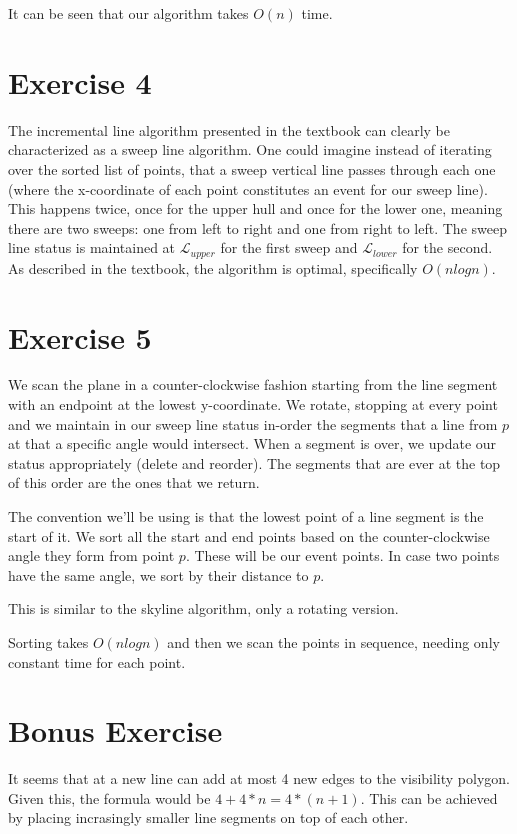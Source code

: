 \documentclass[11pt]{llncs}
\begin{document}
It can be seen that our algorithm takes $O(n)$ time.

\section*{Exercise 4}
The incremental line algorithm presented in the textbook \cite{deberg} can
clearly be characterized as a sweep line algorithm. One could imagine instead
of iterating over the sorted list of points, that a sweep vertical line passes
through each one (where the x-coordinate of each point constitutes an event for
our sweep line). This happens twice, once for the upper hull and once for the
lower one, meaning there are two sweeps: one from left to right and one from
right to left. The sweep line status is maintained at $\mathcal{L}_{upper}$ for
the first sweep and $\mathcal{L}_{lower}$ for the second. As described in the
textbook, the algorithm is optimal, specifically $O(n logn)$.

\section*{Exercise 5}
We scan the plane in a counter-clockwise fashion starting from the line segment
with an endpoint at the lowest y-coordinate. We rotate, stopping at every point
and we maintain in our sweep line status in-order the segments that a line
from $p$ at that a specific angle would intersect. When a segment is over, we
update our status appropriately (delete and reorder). The segments that are
ever at the top of this order are the ones that we return.

The convention we'll be using is that the lowest point of a line segment is the
start of it. We sort all the start and end points based on the
counter-clockwise angle they form from point $p$. These will be our event
points. In case two points have the same angle, we sort by their distance to $p$.

This is similar to the skyline algorithm, only a rotating version.

Sorting takes $O(n logn)$ and then we scan the points in sequence, needing only
constant time for each point.

\section*{Bonus Exercise}
It seems that at a new line can add at most 4 new edges to the visibility
polygon. Given this, the formula would be $4 + 4*n = 4*(n+1)$. This can be
achieved by placing incrasingly smaller line segments on top of each other.


\end{document}
